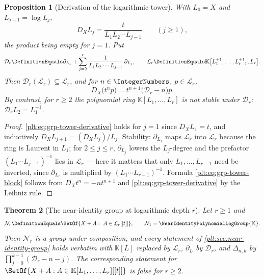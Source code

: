 \documentclass[11pt,oneside]{article}
\theoremstyle{plain}
\newtheorem{theorem}{Theorem}[section]
\newtheorem{proposition}[theorem]{Proposition}
\theoremstyle{definition}
\theoremstyle{remark}
\newcommand{\K}{\mathbb{K}}
\newcommand{\Gnear}{\NearIdentityPolynomialLogGroup{\K}} %
\newcommand{\DX}{D_{X}}                                  %
\newcommand{\shiftop}[2]{\Delta_{#1,#2}}                 %
\begin{document}
\begin{proposition}[Derivation of the logarithmic tower]
\label{plt:prop:grp-tower-derivation}
With \(L_0=X\) and \(L_{j+1}=\log L_j\),
\begin{equation}\label{plt:eq:grp-tower-derivative}
  \DX L_j=\frac{t}{L_1L_2\cdots L_{j-1}}
  \qquad(j\ge1),
\end{equation}
the product being empty for \(j=1\).  Put
\[
  \mathcal D_r
  \DefinitionEquals
  \partial_{L_1}
  +\sum_{j=2}^{r}\frac{1}{L_1L_2\cdots L_{j-1}}\,\partial_{L_j},
  \qquad
  \mathcal L_r
  \DefinitionEquals
  \K\bigl[L_1^{\pm1},\ldots,L_{r-1}^{\pm1},L_r\bigr].
\]
Then \(\mathcal D_r(\mathcal L_r)\subseteq\mathcal L_r\), and for
\(n\in\IntegerNumbers\), \(p\in\mathcal L_r\),
\begin{equation}\label{plt:eq:grp-tower-block}
  \DX\bigl(t^np\bigr)=t^{n+1}\bigl(\mathcal D_r-n\bigr)p .
\end{equation}
By contrast, for \(r\ge2\) the polynomial ring
\(\K[L_1,\ldots,L_r]\) is \emph{not} stable under \(\mathcal D_r\):
\(\mathcal D_r L_2=L_1^{-1}\).
\end{proposition}

\begin{proof}
\eqref{plt:eq:grp-tower-derivative} holds for \(j=1\) since \(\DX L_1=t\), and
inductively \(\DX L_{j+1}=(\DX L_j)/L_j\).  Stability: \(\partial_{L_1}\)
maps \(\mathcal L_r\) into \(\mathcal L_r\) because the ring is Laurent in
\(L_1\); for \(2\le j\le r\), \(\partial_{L_j}\) lowers the \(L_j\)-degree and
the prefactor \((L_1\cdots L_{j-1})^{-1}\) lies in \(\mathcal L_r\) --- here it
matters that only \(L_1,\ldots,L_{r-1}\) need be inverted, since
\(\partial_{L_r}\) is multiplied by \((L_1\cdots L_{r-1})^{-1}\).  Formula
\eqref{plt:eq:grp-tower-block} follows from
\(\DX t^n=-nt^{n+1}\) and \eqref{plt:eq:grp-tower-derivative} by the Leibniz
rule.
\end{proof}


\begin{theorem}[The near-identity group at logarithmic depth \(r\)]
\label{plt:thm:grp-multilog-group}
Let \(r\ge1\) and
\[
  \mathcal N_r\DefinitionEquals\SetOf{X+A:\ A\in\mathcal L_r[[t]]},
  \qquad \mathcal N_1=\Gnear .
\]
Then \(\mathcal N_r\) is a group under composition, and every statement of
\cref{plt:sec:near-identity-group} holds verbatim with \(\K[L]\) replaced by
\(\mathcal L_r\), \(\partial_L\) by \(\mathcal D_r\), and \(\shiftop{n}{k}\) by
\(\prod_{j=0}^{k-1}(\mathcal D_r-n-j)\).  The corresponding statement for
\(\SetOf{X+A:A\in\K[L_1,\ldots,L_r][[t]]}\) is false for \(r\ge2\).
\end{theorem}
\end{document}
